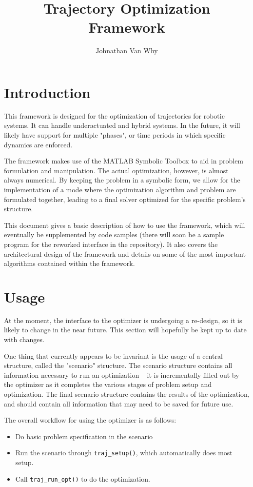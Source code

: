 \documentclass{article}
\title{Trajectory Optimization Framework}
\author{Johnathan Van Why}
\begin{document}
	\maketitle
	\section{Introduction}
		This framework is designed for the optimization of trajectories for robotic systems.
		It can handle underactuated and hybrid systems. In the future, it will likely have support for multiple
		"phases", or time periods in which specific dynamics are enforced.

		The framework makes use of the MATLAB Symbolic Toolbox to aid in problem formulation and manipulation.
		The actual optimization, however, is almost always numerical. By keeping the problem in a symbolic form, we
		allow for the implementation of a mode where the optimization algorithm and problem are formulated together, leading
		to a final solver optimized for the specific problem's structure.

		This document gives a basic description of how to use the framework, which
		will eventually be supplemented by code samples (there will soon be a sample program
		for the reworked interface in the repository). It also covers the architectural design of the framework
		and details on some of the most important algorithms contained within the framework.

	\section{Usage}
		At the moment, the interface to the optimizer is undergoing a re-design, so it is likely to change in the near future.
		This section will hopefully be kept up to date with changes.

		One thing that currently appears to be invariant is the usage of a central structure, called the "scenario" structure.
		The scenario structure contains all information necessary to run an optimization -- it is incrementally filled out by the optimizer
		as it completes the various stages of problem setup and optimization. The final scenario structure contains the results of the optimization,
		and should contain all information that may need to be saved for future use.

		\begin{samepage}
			The overall workflow for using the optimizer is as follows:
			\begin{itemize}
				\item Do basic problem specification in the scenario
				\item Run the scenario through \lstinline|traj_setup()|, which automatically does most setup.
				\item Call \lstinline|traj_run_opt()| to do the optimization.
			\end{itemize}
		\end{samepage}
\end{document}
